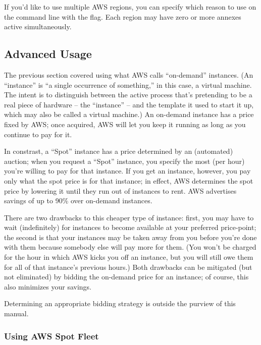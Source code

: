 If you'd like to use multiple AWS regions, you can specify which reason to use
on the command line with the  flag.  Each region may have
zero or more annexes active simultaneously.

\subsection{Advanced Usage}

The previous section covered using what AWS calls ``on-demand''
instances.  (An ``instance'' is ``a single occurrence of something,'' in
this case, a virtual machine.  The intent is to distinguish between the
active process that's pretending to be a real piece of hardware --
the ``instance'' -- and the template it used to start it up, which may also
be called a virtual machine.)  An on-demand instance has a price fixed by AWS;
once acquired, AWS will let you keep it running as long as you continue to
pay for it.

In constrast, a ``Spot'' instance has a price determined by an (automated)
auction; when you request a ``Spot'' instance, you specify the most (per hour)
you're willing to pay for that instance.  If you get an instance, however,
you pay only what the spot price is for that instance; in effect, AWS
determines the spot price by lowering it until they run out of instances
to rent.  AWS advertises savings of up to 90\% over on-demand instances.

There are two drawbacks to this cheaper type of instance: first,
you may have to wait (indefinitely) for instances to become available at
your preferred price-point; the second is that your instances may be taken
away from you before you're done with them because somebody else will pay
more for them.  (You won't be charged for the hour in which AWS kicks
you off an instance, but you will still owe them for all of that instance's
previous hours.)  Both drawbacks can be mitigated (but not eliminated) by
bidding the on-demand price for an instance; of course, this also minimizes
your savings.

Determining an appropriate bidding strategy is outside the purview of
this manual.

\subsubsection{Using AWS Spot Fleet}

